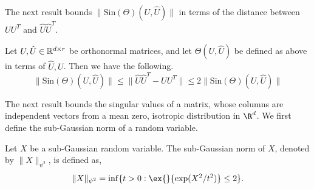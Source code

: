 
The next result bounds $\|\text{Sin}(\Theta)(U,\hat{U})\|$ in terms
of the distance between $UU^T$ and $\hat{U}\hat{U}^T$.

\begin{lemma}\label{lem:sin-theta-property}
    Let $U,\hat{U} \in \mathbb{R}^{d \times r}$ be orthonormal
    matrices, and let $\Theta(U,\hat{U})$ be defined as above in terms
    of $\hat{U},U$. Then we have the following.
    $$\|\text{Sin}(\Theta)(U,\hat{U})\| \leq \|\hat{U}\hat{U}^T-UU^T\|
        \leq 2\|\text{Sin}(\Theta)(U,\hat{U})\|$$
\end{lemma}

The next result bounds the singular values of a matrix,
whose columns are independent vectors from a mean zero,
isotropic distribution in $\R^d$. We first define the
sub-Gaussian norm of a random variable.

\begin{definition}
    Let $X$ be a sub-Gaussian random variable. The sub-Gaussian
    norm of $X$, denoted by $\|X\|_{\psi^2}$, is defined as,
    $$\|X\|_{\psi^2} = \inf\{t>0: \ex{}{\exp(X^2/t^2)} \leq 2\}.$$
\end{definition}

